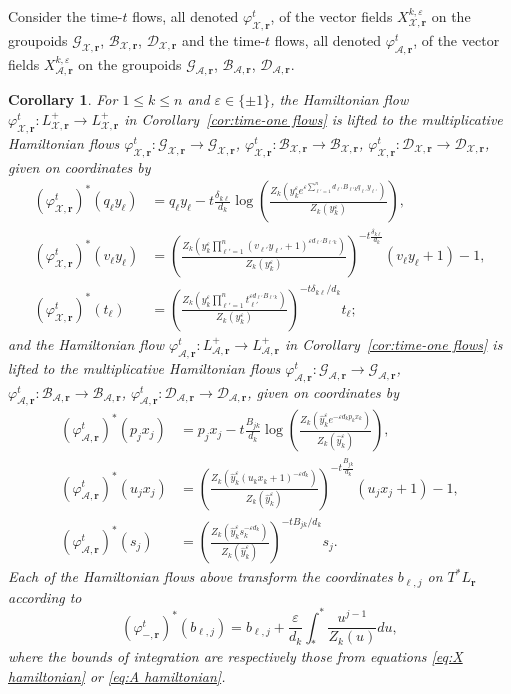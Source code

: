 \documentclass{amsart}
\newtheorem{corollary}[theorem]{Corollary}
\numberwithin{equation}{section}
\newcommand{\bfr}{{\boldsymbol{r}}}
\newcommand{\cA}{\mathcal{A}}
\newcommand{\cB}{\mathcal{B}}
\newcommand{\cD}{\mathcal{D}}
\newcommand{\cG}{\mathcal{G}}
\newcommand{\cX}{\mathcal{X}}
\begin{document}
Consider the time-$t$ flows, all denoted $\varphi_{\cX,\bfr}^t$, of the vector fields $X_{\cX,\bfr}^{k,\varepsilon}$ on the groupoids $\cG_{\cX,\bfr}$, $\cB_{\cX,\bfr}$, $\cD_{\cX,\bfr}$ and the time-$t$ flows, all denoted $\varphi_{\cA,\bfr}^t$, of the vector fields $X_{\cA,\bfr}^{k,\varepsilon}$ on the groupoids $\cG_{\cA,\bfr}$, $\cB_{\cA,\bfr}$, $\cD_{\cA,\bfr}$.
\begin{corollary}
  For $1\le k\le n$ and $\varepsilon\in\{\pm1\}$, the Hamiltonian flow $\varphi_{\cX,\bfr}^t: L^+_{\cX,\bfr} \to L^+_{\cX,\bfr}$ in Corollary~\ref{cor:time-one flows} is lifted to the multiplicative Hamiltonian flows $\varphi_{\cX,\bfr}^t: \cG_{\cX,\bfr} \to \cG_{\cX,\bfr}$, $\varphi_{\cX,\bfr}^t: \cB_{\cX,\bfr} \to \cB_{\cX,\bfr}$, $\varphi_{\cX,\bfr}^t: \cD_{\cX,\bfr} \to \cD_{\cX,\bfr}$, given on coordinates by
  \begin{align*}
    (\varphi_{\cX,\bfr}^t)^*(q_\ell y_\ell)&=q_\ell y_\ell-t\frac{\delta_{k\ell}}{d_k}\log\left(\frac{Z_k\left(y_k^\varepsilon e^{\varepsilon\sum_{\ell'=1}^n d_{\ell'} B_{\ell' k}q_{\ell'} y_{\ell'}}\right)}{Z_k(y_k^\varepsilon)}\right),\\
    (\varphi_{\cX,\bfr}^t)^*(v_\ell y_\ell)&=\left(\frac{Z_k\left(y_k^\varepsilon \prod_{\ell'=1}^n (v_{\ell'} y_{\ell'} + 1)^{\varepsilon d_{\ell'} B_{\ell' k}}\right)}{Z_k(y_k^\varepsilon)}\right)^{-t\frac{\delta_{k\ell}}{d_k}}(v_\ell y_\ell+1)-1,\\
    (\varphi_{\cX,\bfr}^t)^*(t_\ell)&=\left(\frac{Z_k\left(y_k^\varepsilon \prod_{\ell'=1}^n t_{\ell'}^{\varepsilon d_{\ell'} B_{\ell' k}}\right)}{Z_k(y_k^\varepsilon)}\right)^{-t\delta_{k\ell}/d_k}t_\ell;
  \end{align*}
  and the Hamiltonian flow $\varphi_{\cA,\bfr}^t: L^+_{\cA,\bfr} \to L^+_{\cA,\bfr}$ in Corollary~\ref{cor:time-one flows} is lifted to the multiplicative Hamiltonian flows $\varphi_{\cA,\bfr}^t: \cG_{\cA,\bfr} \to \cG_{\cA,\bfr}$, $\varphi_{\cA,\bfr}^t: \cB_{\cA,\bfr} \to \cB_{\cA,\bfr}$, $\varphi_{\cA,\bfr}^t: \cD_{\cA,\bfr} \to \cD_{\cA,\bfr}$, given on coordinates by
  \begin{align*}
    (\varphi_{\cA,\bfr}^t)^*(p_jx_j)&=p_jx_j-t\frac{B_{jk}}{d_k}\log\left(\frac{Z_k\left(\hat y_k^\varepsilon e^{-\varepsilon d_kp_kx_k}\right)}{Z_k(\hat y_k^\varepsilon)}\right), \\
    (\varphi_{\cA,\bfr}^t)^*(u_jx_j)&=\left(\frac{Z_k\left(\hat y_k^\varepsilon (u_kx_k+1)^{-\varepsilon d_k}\right)}{Z_k(\hat y_k^\varepsilon)}\right)^{-t\frac{B_{jk}}{d_k}}(u_jx_j+1)-1, \\
    (\varphi_{\cA,\bfr}^t)^*(s_j)&=\left(\frac{Z_k\left(\hat y_k^\varepsilon s_k^{-\varepsilon d_k}\right)}{Z_k(\hat y_k^\varepsilon)}\right)^{-tB_{jk}/d_k}s_j.
  \end{align*}
  Each of the Hamiltonian flows above transform the coordinates $b_{\ell,j}$ on $T^*L_\bfr$ according to
  \begin{equation*}
    (\varphi_{-,\bfr}^t)^*(b_{\ell,j})=b_{\ell,j}+\frac{\varepsilon}{d_k}\int_*^* \frac{u^{j-1}}{Z_k(u)}du,
  \end{equation*}
  where the bounds of integration are respectively those from equations \eqref{eq:X hamiltonian} or \eqref{eq:A hamiltonian}.
\end{corollary}
\end{document}
